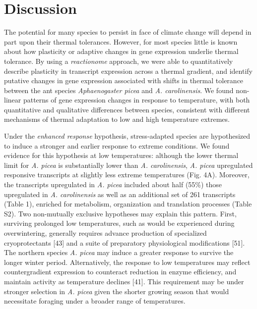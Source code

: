 \documentclass[]{article}
\begin{document}
\section{Discussion}\label{discussion}

The potential for many species to persist in face of climate change will
depend in part upon their thermal tolerances. However, for most species
little is known about how plasticity or adaptive changes in gene
expression underlie thermal tolerance. By using a \emph{reactionome}
approach, we were able to quantitatively describe plasticity in
transcript expression across a thermal gradient, and identify putative
changes in gene expression associated with shifts in thermal tolerance
between the ant species \emph{Aphaenogaster picea} and \emph{A.
carolinensis}. We found non-linear patterns of gene expression changes
in response to temperature, with both quantitative and qualitative
differences between species, consistent with different mechanisms of
thermal adaptation to low and high temperature extremes.

Under the \emph{enhanced response} hypothesis, stress-adapted species
are hypothesized to induce a stronger and earlier response to extreme
conditions. We found evidence for this hypothesis at low temperatures:
although the lower thermal limit for \emph{A. picea} is substantially
lower than \emph{A. carolinensis}, \emph{A. picea} upregulated
responsive transcripts at slightly less extreme temperatures (Fig. 4A).
Moreover, the transcripts upregulated in \emph{A. picea} included about
half (55\%) those upregulated in \emph{A. carolinensis} as well as an
additional set of 261 transcripts (Table 1), enriched for metabolism,
organization and translation processes (Table S2). Two non-mutually
exclusive hypotheses may explain this pattern. First, surviving
prolonged low temperatures, such as would be experienced during
overwintering, generally requires advance production of specialized
cryoprotectants {[}43{]} and a suite of preparatory physiological
modifications {[}51{]}. The northern species \emph{A. picea} may induce
a greater response to survive the longer winter period. Alternatively,
the response to low temperatures may reflect countergradient expression
to counteract reduction in enzyme efficiency, and maintain activity as
temperature declines {[}41{]}. This requirement may be under stronger
selection in \emph{A. picea} given the shorter growing season that would
necessitate foraging under a broader range of temperatures.
\end{document}
